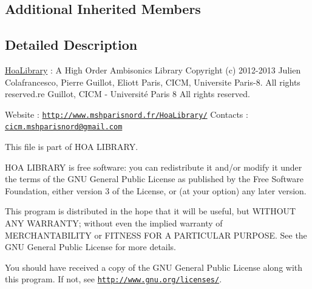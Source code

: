 \subsection*{Additional Inherited Members}


\subsection{Detailed Description}
\hyperlink{interface_hoa_library}{Hoa\-Library} \-: A High Order Ambisonics Library Copyright (c) 2012-\/2013 Julien Colafrancesco, Pierre Guillot, Eliott Paris, C\-I\-C\-M, Universite Paris-\/8. All rights reserved.\-re Guillot, C\-I\-C\-M -\/ Université Paris 8 All rights reserved.

Website \-: \href{http://www.mshparisnord.fr/HoaLibrary/}{\tt http\-://www.\-mshparisnord.\-fr/\-Hoa\-Library/} Contacts \-: \href{mailto:cicm.mshparisnord@gmail.com}{\tt cicm.\-mshparisnord@gmail.\-com}

This file is part of H\-O\-A L\-I\-B\-R\-A\-R\-Y.

H\-O\-A L\-I\-B\-R\-A\-R\-Y is free software\-: you can redistribute it and/or modify it under the terms of the G\-N\-U General Public License as published by the Free Software Foundation, either version 3 of the License, or (at your option) any later version.

This program is distributed in the hope that it will be useful, but W\-I\-T\-H\-O\-U\-T A\-N\-Y W\-A\-R\-R\-A\-N\-T\-Y; without even the implied warranty of M\-E\-R\-C\-H\-A\-N\-T\-A\-B\-I\-L\-I\-T\-Y or F\-I\-T\-N\-E\-S\-S F\-O\-R A P\-A\-R\-T\-I\-C\-U\-L\-A\-R P\-U\-R\-P\-O\-S\-E. See the G\-N\-U General Public License for more details.

You should have received a copy of the G\-N\-U General Public License along with this program. If not, see \href{http://www.gnu.org/licenses/}{\tt http\-://www.\-gnu.\-org/licenses/}. 

